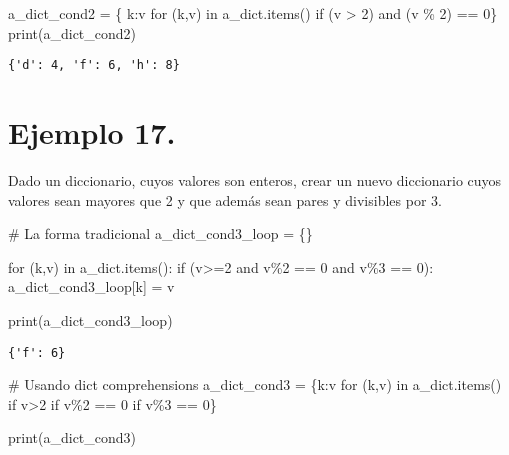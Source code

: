 \documentclass[
  letterpaper,
  DIV=11,
  numbers=noendperiod]{scrreprt}
\newenvironment{Shaded}{\begin{snugshade}}{\end{snugshade}}
\newcommand{\BuiltInTok}[1]{\textcolor[rgb]{0.00,0.23,0.31}{#1}}
\newcommand{\CommentTok}[1]{\textcolor[rgb]{0.37,0.37,0.37}{#1}}
\newcommand{\ControlFlowTok}[1]{\textcolor[rgb]{0.00,0.23,0.31}{#1}}
\newcommand{\DecValTok}[1]{\textcolor[rgb]{0.68,0.00,0.00}{#1}}
\newcommand{\KeywordTok}[1]{\textcolor[rgb]{0.00,0.23,0.31}{#1}}
\newcommand{\NormalTok}[1]{\textcolor[rgb]{0.00,0.23,0.31}{#1}}
\newcommand{\OperatorTok}[1]{\textcolor[rgb]{0.37,0.37,0.37}{#1}}
\begin{document}
\begin{Shaded}
\begin{Highlighting}[]
\NormalTok{a\_dict\_cond2 }\OperatorTok{=}\NormalTok{ \{ k:v }\ControlFlowTok{for}\NormalTok{ (k,v) }\KeywordTok{in}\NormalTok{ a\_dict.items() }\ControlFlowTok{if}\NormalTok{ (v }\OperatorTok{\textgreater{}} \DecValTok{2}\NormalTok{) }\KeywordTok{and}\NormalTok{ (v }\OperatorTok{\%} \DecValTok{2}\NormalTok{) }\OperatorTok{==} \DecValTok{0}\NormalTok{\}}
\BuiltInTok{print}\NormalTok{(a\_dict\_cond2)}
\end{Highlighting}
\end{Shaded}

\begin{verbatim}
{'d': 4, 'f': 6, 'h': 8}
\end{verbatim}

\section{\texorpdfstring{\textbf{Ejemplo
17.}}{Ejemplo 17.}}\label{ejemplo-17.-1}

Dado un diccionario, cuyos valores son enteros, crear un nuevo
diccionario cuyos valores sean mayores que 2 y que además sean pares y
divisibles por 3.

\begin{Shaded}
\begin{Highlighting}[]
\CommentTok{\# La forma tradicional}
\NormalTok{a\_dict\_cond3\_loop }\OperatorTok{=}\NormalTok{ \{\}}

\ControlFlowTok{for}\NormalTok{ (k,v) }\KeywordTok{in}\NormalTok{ a\_dict.items():}
    \ControlFlowTok{if}\NormalTok{ (v}\OperatorTok{\textgreater{}=}\DecValTok{2} \KeywordTok{and}\NormalTok{ v}\OperatorTok{\%}\DecValTok{2} \OperatorTok{==} \DecValTok{0} \KeywordTok{and}\NormalTok{ v}\OperatorTok{\%}\DecValTok{3} \OperatorTok{==} \DecValTok{0}\NormalTok{):}
\NormalTok{        a\_dict\_cond3\_loop[k] }\OperatorTok{=}\NormalTok{ v}

\BuiltInTok{print}\NormalTok{(a\_dict\_cond3\_loop)}
\end{Highlighting}
\end{Shaded}

\begin{verbatim}
{'f': 6}
\end{verbatim}

\begin{Shaded}
\begin{Highlighting}[]
\CommentTok{\# Usando dict comprehensions}
\NormalTok{a\_dict\_cond3 }\OperatorTok{=}\NormalTok{ \{k:v }\ControlFlowTok{for}\NormalTok{ (k,v) }\KeywordTok{in}\NormalTok{ a\_dict.items() }\ControlFlowTok{if}\NormalTok{ v}\OperatorTok{\textgreater{}}\DecValTok{2} \ControlFlowTok{if}\NormalTok{ v}\OperatorTok{\%}\DecValTok{2} \OperatorTok{==} \DecValTok{0} \ControlFlowTok{if}\NormalTok{ v}\OperatorTok{\%}\DecValTok{3} \OperatorTok{==} \DecValTok{0}\NormalTok{\}}

\BuiltInTok{print}\NormalTok{(a\_dict\_cond3)}
\end{Highlighting}
\end{Shaded}
\end{document}
